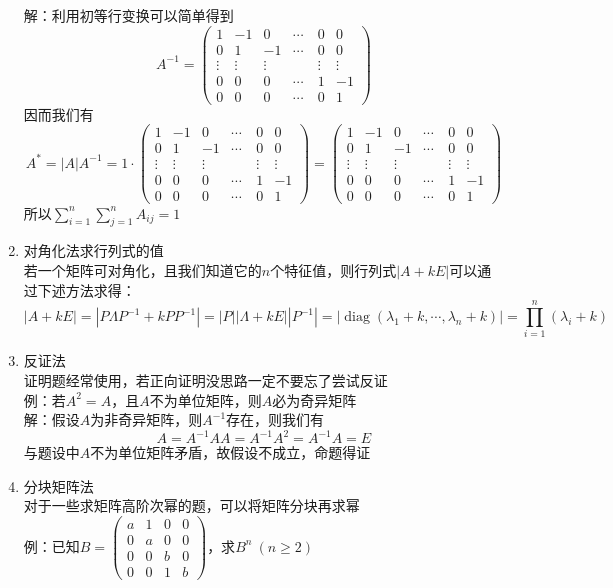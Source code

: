 \documentclass[12pt,a4paper,UTF8]{book}
\begin{document}
\begin{enumerate}
解：利用初等行变换可以简单得到
\[A^{-1}=\begin{pmatrix}1&-1&0&\cdots&0&0\\0&1&-1&\cdots&0&0\\\vdots&\vdots&\vdots&\quad&\vdots&\vdots\\0&0&0&\cdots&1&-1\\0&0&0&\cdots&0&1\end{pmatrix}\]
因而我们有
\[A^*=\left|A\right|A^{-1}=1\cdot\begin{pmatrix}1&-1&0&\cdots&0&0\\0&1&-1&\cdots&0&0\\\vdots&\vdots&\vdots&\quad&\vdots&\vdots\\0&0&0&\cdots&1&-1\\0&0&0&\cdots&0&1\end{pmatrix}=\begin{pmatrix}1&-1&0&\cdots&0&0\\0&1&-1&\cdots&0&0\\\vdots&\vdots&\vdots&\quad&\vdots&\vdots\\0&0&0&\cdots&1&-1\\0&0&0&\cdots&0&1\end{pmatrix}\]
所以$\sum\limits_{i=1}^n\sum\limits_{j=1}^nA_{ij}=1$
\item 对角化法求行列式的值\\
若一个矩阵可对角化，且我们知道它的$n$个特征值，则行列式$\left|A+kE\right|$可以通过下述方法求得：
\[\left|A+kE\right|=\left|P\Lambda P^{-1}+kPP^{-1}\right|=\left|P\right|\left|\Lambda+kE\right|\left|P^{-1}\right|=\left|\operatorname{diag}\left(\lambda_1+k,\cdots,\lambda_n+k\right)\right|=\prod\limits_{i=1}^n\left(\lambda_i+k\right)\]
\item 反证法\\
证明题经常使用，若正向证明没思路一定不要忘了尝试反证\\
例：若$A^2=A$，且$A$不为单位矩阵，则$A$必为奇异矩阵\\
解：假设$A$为非奇异矩阵，则$A^{-1}$存在，则我们有
\[A=A^{-1}AA=A^{-1}A^2=A^{-1}A=E\]
与题设中$A$不为单位矩阵矛盾，故假设不成立，命题得证
\item 分块矩阵法\\
对于一些求矩阵高阶次幂的题，可以将矩阵分块再求幂\\
例：已知$B=\begin{pmatrix}a&1&0&0\\0&a&0&0\\0&0&b&0\\0&0&1&b\end{pmatrix}$，求$B^n\ \left(n\geq2\right)$\\

\end{enumerate}
\end{document}
